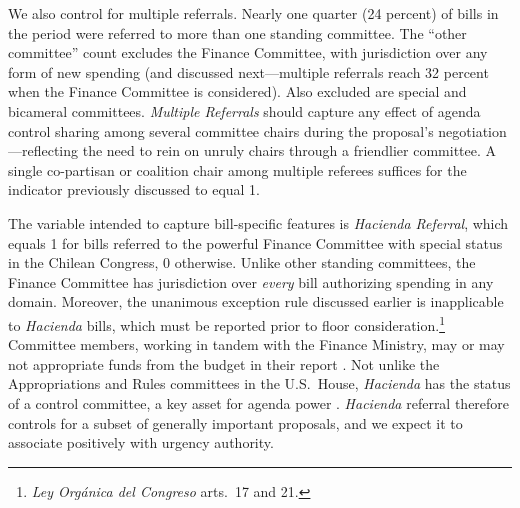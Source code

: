 \documentclass[letter,12pt]{article}
\begin{document}
We also control for multiple referrals. Nearly one quarter (24 percent) of bills in the period were referred to more than one standing committee. The ``other committee'' count excludes the Finance Committee, with jurisdiction over any form of new spending (and discussed next---multiple referrals reach 32 percent when the Finance Committee is considered). Also excluded are special and bicameral committees. \emph{Multiple Referrals} should capture any effect of agenda control sharing among several committee chairs during the proposal's negotiation---reflecting the need to rein on unruly chairs through a friendlier committee. A single co-partisan or coalition chair among multiple referees suffices for the indicator previously discussed to equal 1. 

The variable intended to capture bill-specific features is \emph{Hacienda Referral}, which equals 1 for bills referred to the powerful Finance Committee with special status in the Chilean Congress, 0 otherwise. Unlike other standing committees, the Finance Committee has jurisdiction over \emph{every} bill authorizing spending in any domain. Moreover, the unanimous exception rule discussed earlier is inapplicable to \emph{Hacienda} bills, which must be reported prior to floor consideration.\footnote{\emph{Ley Org\'anica del Congreso} arts.\ 17 and 21.} Committee members, working in tandem with the Finance Ministry, may or may not appropriate funds from the budget in their report \citep{aleman.navia.UrgChi.2009}. Not unlike the Appropriations and Rules committees in the U.S.\ House, \emph{Hacienda} has the status of a control committee, a key asset for agenda power \citep{kiewiet.mccubbins.1991}. \emph{Hacienda} referral therefore controls for a subset of generally important proposals, and we expect it to associate positively with urgency authority.
\end{document}
